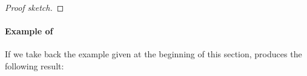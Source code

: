 \begin{proof}[Proof sketch]
\end{proof}



\paragraph*{Example of \mapdeduplication}
If we take back the example given at the beginning of this section,
\mapdeduplication produces the following result:

% 


